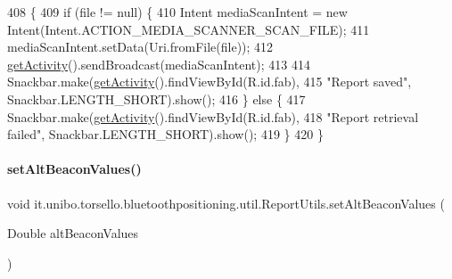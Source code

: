 \begin{DoxyCode}
408                                              \{
409         \textcolor{keywordflow}{if} (file != null) \{
410             Intent mediaScanIntent = \textcolor{keyword}{new} Intent(Intent.ACTION\_MEDIA\_SCANNER\_SCAN\_FILE);
411             mediaScanIntent.setData(Uri.fromFile(file));
412             \hyperlink{classit_1_1unibo_1_1torsello_1_1bluetoothpositioning_1_1util_1_1ReportUtils_a397da2904c606315301d19eb39451181_a397da2904c606315301d19eb39451181}{getActivity}().sendBroadcast(mediaScanIntent);
413 
414             Snackbar.make(\hyperlink{classit_1_1unibo_1_1torsello_1_1bluetoothpositioning_1_1util_1_1ReportUtils_a397da2904c606315301d19eb39451181_a397da2904c606315301d19eb39451181}{getActivity}().findViewById(R.id.fab),
415                     \textcolor{stringliteral}{"Report saved"}, Snackbar.LENGTH\_SHORT).show();
416         \} \textcolor{keywordflow}{else} \{
417             Snackbar.make(\hyperlink{classit_1_1unibo_1_1torsello_1_1bluetoothpositioning_1_1util_1_1ReportUtils_a397da2904c606315301d19eb39451181_a397da2904c606315301d19eb39451181}{getActivity}().findViewById(R.id.fab),
418                     \textcolor{stringliteral}{"Report retrieval failed"}, Snackbar.LENGTH\_SHORT).show();
419         \}
420     \}
\end{DoxyCode}
\hypertarget{classit_1_1unibo_1_1torsello_1_1bluetoothpositioning_1_1util_1_1ReportUtils_ae68aaee9a1033dd6659cc3d6af970f60_ae68aaee9a1033dd6659cc3d6af970f60}{}\label{classit_1_1unibo_1_1torsello_1_1bluetoothpositioning_1_1util_1_1ReportUtils_ae68aaee9a1033dd6659cc3d6af970f60_ae68aaee9a1033dd6659cc3d6af970f60} 
\paragraph{\texorpdfstring{set\+Alt\+Beacon\+Values()}{setAltBeaconValues()}}
{\footnotesize\ttfamily void it.\+unibo.\+torsello.\+bluetoothpositioning.\+util.\+Report\+Utils.\+set\+Alt\+Beacon\+Values (\begin{DoxyParamCaption}\item[{Double}]{alt\+Beacon\+Values }\end{DoxyParamCaption})}


